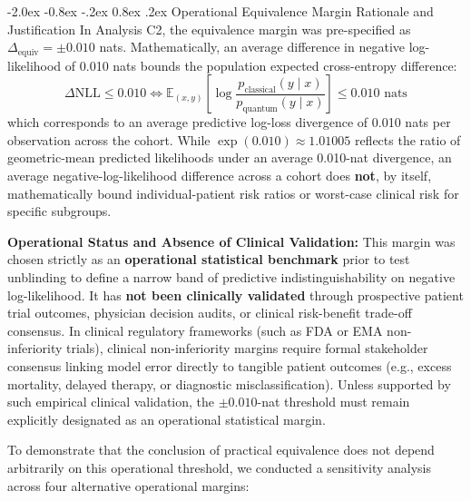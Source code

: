 \documentclass[10pt,a4paper]{article}
\makeatletter
\renewcommand{\subsection}{\@startsection{subsection}{2}{\z@}%
  {-2.0ex \@plus -0.8ex \@minus -.2ex}%
  {0.8ex \@plus.2ex}%
  {\normalfont\large\sffamily\bfseries\color{naturedark}}}
\makeatother
\begin{document}
\subsection{Operational Equivalence Margin Rationale and Justification}
In Analysis C2, the equivalence margin was pre-specified as $\Delta_{\text{equiv}} = \pm 0.010$ nats. Mathematically, an average difference in negative log-likelihood of 0.010 nats bounds the population expected cross-entropy difference:
\begin{equation}
\Delta\text{NLL} \le 0.010 \iff \mathbb{E}_{(x, y)}\left[\log \frac{p_{\text{classical}}(y \mid x)}{p_{\text{quantum}}(y \mid x)}\right] \le 0.010 \text{ nats}
\end{equation}
which corresponds to an average predictive log-loss divergence of 0.010 nats per observation across the cohort. While $\exp(0.010) \approx 1.01005$ reflects the ratio of geometric-mean predicted likelihoods under an average 0.010-nat divergence, an average negative-log-likelihood difference across a cohort does \textbf{not}, by itself, mathematically bound individual-patient risk ratios or worst-case clinical risk for specific subgroups.

\textbf{Operational Status and Absence of Clinical Validation:} This margin was chosen strictly as an \textbf{operational statistical benchmark} prior to test unblinding to define a narrow band of predictive indistinguishability on negative log-likelihood. It has \textbf{not been clinically validated} through prospective patient trial outcomes, physician decision audits, or clinical risk-benefit trade-off consensus. In clinical regulatory frameworks (such as FDA or EMA non-inferiority trials), clinical non-inferiority margins require formal stakeholder consensus linking model error directly to tangible patient outcomes (e.g., excess mortality, delayed therapy, or diagnostic misclassification). Unless supported by such empirical clinical validation, the $\pm 0.010$-nat threshold must remain explicitly designated as an operational statistical margin.

To demonstrate that the conclusion of practical equivalence does not depend arbitrarily on this operational threshold, we conducted a sensitivity analysis across four alternative operational margins:
\end{document}
